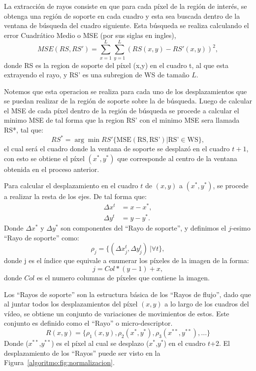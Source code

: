 	La extracción de rayos consiste en que para cada píxel de la región de interés, se obtenga una región de soporte en cada cuadro y esta sea buscada dentro de la ventana de búsqueda del cuadro siguiente. Esta búsqueda se realiza calculando el error Cuadrático Medio o MSE (por sus siglas en ingles), \begin{equation}\label{algoritmo:eq:mse}	
			MSE(\mathit{RS},\mathit{RS'}) = \sum_{x=1}^{L} \sum_{y=1}^{L} (\mathit{RS}(x,y) - \mathit{RS'}(x,y))^2,
		\end{equation} 
	donde RS es la region de soporte del píxel (x,y) en el cuadro t, al que esta extrayendo el rayo, y RS' es una subregion de WS de tamaño $L$.
		
	Notemos que esta operacion se realiza para cada uno de los desplazamientos que se puedan realizar de la región de soporte sobre la de búsqueda. Luego de calcular el MSE de cada píxel dentro de la región de búsqueda se procede a calcular el minimo MSE de tal forma que la region RS' con el minimo MSE sera llamada RS*, tal que:
	\begin{equation}
		RS^* = \arg \min{RS'}\{\text{MSE}(\text{RS},\text{RS'}) | \text{RS'} \in \text{WS}\},
	\end{equation}		
	el cual será el cuadro donde la ventana de soporte se desplazó en el cuadro $t+1$, con esto se obtiene el píxel $(x^*,y^*)$ que corresponde al centro de la ventana obtenida en el proceso anterior.
	
	Para calcular el desplazamiento en el cuadro $t$ de $(x,y)$ a $(x^*,y^*)$, se procede a realizar la resta de los ejes. De tal forma que:
	\begin{align}
		\Delta x^{t} &= x-x^*,\\ 
		\Delta y^{t} &= y-y^*.
	\end{align}
		Donde $ \Delta x^*$ y $ \Delta y^*$ son componentes del ``Rayo de soporte'', y definimos el $j$-esimo ``Rayo de soporte'' como:
	\begin{equation}
		\rho_j = \{(\Delta x_j^{t}, \Delta y_j^{t})~| \forall t\},
	\end{equation}		
	donde j es el índice que equivale a enumerar los píxeles de la imagen de la forma:
	\begin{equation}
		j = Col*(y-1) + x,
	\end{equation}
	donde $Col$ es el numero columnas de píxeles que contiene la imagen.
	
	Los ``Rayos de soporte'' son la estructura básica de los ``Rayos de flujo'', dado que al juntar todos los desplazamientos del píxel $(x,y)$ a lo largo de los cuadros del vídeo, se obtiene un conjunto de variaciones de movimientos de estos. Este conjunto es definido como el ``Rayo'' o micro-descriptor.
	\begin{equation}
		R(x,y)	 = \{\rho_1(x,y), \rho_2(x^*,y^*), \rho_3(x^{**},y^{**}), ... \}
	\end{equation}
		Donde ($x^{**}$,$y^{**}$) es el píxel al cual se desplazo ($x^{*}$,$y^{*}$) en el cuadro $t$+2. El desplazamiento de los ``Rayos'' puede ser visto en la Figura~\ref{algoritmo:fig:normalizacion}.
		
